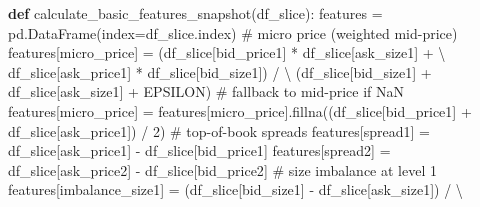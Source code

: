 \documentclass[
  letterpaper,
  DIV=11,
  numbers=noendperiod]{scrartcl}
\newenvironment{Shaded}{\begin{snugshade}}{\end{snugshade}}
\newcommand{\CommentTok}[1]{\textcolor[rgb]{0.37,0.37,0.37}{#1}}
\newcommand{\DecValTok}[1]{\textcolor[rgb]{0.68,0.00,0.00}{#1}}
\newcommand{\KeywordTok}[1]{\textcolor[rgb]{0.00,0.23,0.31}{\textbf{#1}}}
\newcommand{\NormalTok}[1]{\textcolor[rgb]{0.00,0.23,0.31}{#1}}
\newcommand{\OperatorTok}[1]{\textcolor[rgb]{0.37,0.37,0.37}{#1}}
\newcommand{\StringTok}[1]{\textcolor[rgb]{0.13,0.47,0.30}{#1}}
\begin{document}
\begin{Shaded}
\begin{Highlighting}[]
\KeywordTok{def}\NormalTok{ calculate\_basic\_features\_snapshot(df\_slice):}
\NormalTok{    features }\OperatorTok{=}\NormalTok{ pd.DataFrame(index}\OperatorTok{=}\NormalTok{df\_slice.index)}
    \CommentTok{\# micro price (weighted mid{-}price)}
\NormalTok{    features[}\StringTok{\textquotesingle{}micro\_price\textquotesingle{}}\NormalTok{] }\OperatorTok{=}\NormalTok{ (df\_slice[}\StringTok{\textquotesingle{}bid\_price1\textquotesingle{}}\NormalTok{] }\OperatorTok{*}\NormalTok{ df\_slice[}\StringTok{\textquotesingle{}ask\_size1\textquotesingle{}}\NormalTok{] }\OperatorTok{+} \OperatorTok{\textbackslash{}}
\NormalTok{                               df\_slice[}\StringTok{\textquotesingle{}ask\_price1\textquotesingle{}}\NormalTok{] }\OperatorTok{*}\NormalTok{ df\_slice[}\StringTok{\textquotesingle{}bid\_size1\textquotesingle{}}\NormalTok{]) }\OperatorTok{/} \OperatorTok{\textbackslash{}}
\NormalTok{                              (df\_slice[}\StringTok{\textquotesingle{}bid\_size1\textquotesingle{}}\NormalTok{] }\OperatorTok{+}\NormalTok{ df\_slice[}\StringTok{\textquotesingle{}ask\_size1\textquotesingle{}}\NormalTok{] }\OperatorTok{+}\NormalTok{ EPSILON)}
    \CommentTok{\# fallback to mid{-}price if NaN}
\NormalTok{    features[}\StringTok{\textquotesingle{}micro\_price\textquotesingle{}}\NormalTok{] }\OperatorTok{=}\NormalTok{ features[}\StringTok{\textquotesingle{}micro\_price\textquotesingle{}}\NormalTok{].fillna((df\_slice[}\StringTok{\textquotesingle{}bid\_price1\textquotesingle{}}\NormalTok{] }\OperatorTok{+}\NormalTok{ df\_slice[}\StringTok{\textquotesingle{}ask\_price1\textquotesingle{}}\NormalTok{]) }\OperatorTok{/} \DecValTok{2}\NormalTok{)}
    \CommentTok{\# top{-}of{-}book spreads}
\NormalTok{    features[}\StringTok{\textquotesingle{}spread1\textquotesingle{}}\NormalTok{] }\OperatorTok{=}\NormalTok{ df\_slice[}\StringTok{\textquotesingle{}ask\_price1\textquotesingle{}}\NormalTok{] }\OperatorTok{{-}}\NormalTok{ df\_slice[}\StringTok{\textquotesingle{}bid\_price1\textquotesingle{}}\NormalTok{]}
\NormalTok{    features[}\StringTok{\textquotesingle{}spread2\textquotesingle{}}\NormalTok{] }\OperatorTok{=}\NormalTok{ df\_slice[}\StringTok{\textquotesingle{}ask\_price2\textquotesingle{}}\NormalTok{] }\OperatorTok{{-}}\NormalTok{ df\_slice[}\StringTok{\textquotesingle{}bid\_price2\textquotesingle{}}\NormalTok{]}
    \CommentTok{\# size imbalance at level 1}
\NormalTok{    features[}\StringTok{\textquotesingle{}imbalance\_size1\textquotesingle{}}\NormalTok{] }\OperatorTok{=}\NormalTok{ (df\_slice[}\StringTok{\textquotesingle{}bid\_size1\textquotesingle{}}\NormalTok{] }\OperatorTok{{-}}\NormalTok{ df\_slice[}\StringTok{\textquotesingle{}ask\_size1\textquotesingle{}}\NormalTok{]) }\OperatorTok{/} \OperatorTok{\textbackslash{}}

\end{Highlighting}
\end{Shaded}
\end{document}
